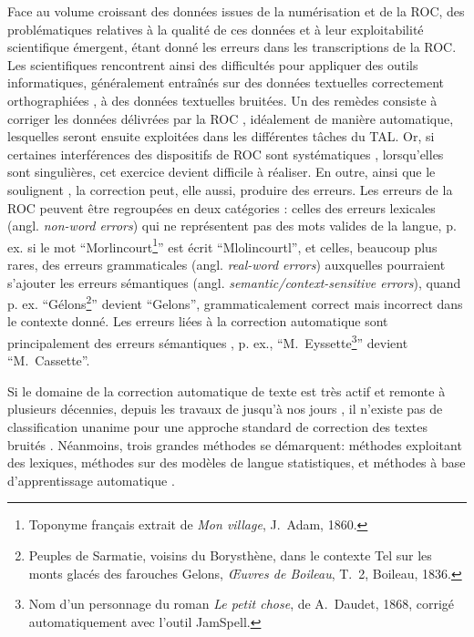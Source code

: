 Face au volume croissant des données issues de la numérisation et de la ROC, des problématiques relatives à la qualité de ces données et à leur exploitabilité scientifique émergent, étant donné 
les erreurs dans les transcriptions de la ROC. Les scientifiques rencontrent ainsi des difficultés pour appliquer des outils informatiques, généralement entraînés sur des données textuelles correctement orthographiées \cite{DBLP:journals/corr/EshelCRMYL17}, à des données textuelles bruitées. Un des remèdes consiste à corriger les données délivrées par la ROC \cite{DBLP:conf/taln/SagotG14}, idéalement de manière automatique, lesquelles seront ensuite exploitées dans les différentes tâches du TAL. Or, si certaines interférences des dispositifs de ROC sont systématiques \cite{stanislawek-2019}, lorsqu’elles sont singulières, cet exercice devient difficile à réaliser. En outre, ainsi que le soulignent , la correction peut, elle aussi, produire des erreurs. 
Les erreurs de la ROC peuvent être regroupées en deux catégories \cite{oger} : celles des erreurs lexicales (angl. \textit{non-word errors}) qui ne représentent pas des mots valides de la langue, p. ex. si le mot “Morlincourt\footnote{Toponyme français extrait de \textit{Mon village}, J.\ Adam, 1860.}” est écrit “Mlolincourtl”, et celles, beaucoup plus rares, des erreurs grammaticales (angl. \textit{real-word errors}) \cite{wisniewski} auxquelles pourraient s'ajouter les erreurs sémantiques (angl. \textit{semantic/context-sensitive errors}), quand p. ex. “Gélons\footnote{Peuples de Sarmatie, voisins du Borysthène, dans le contexte  \og{}Tel sur les monts glacés des farouches Gelons\fg{}, \textit{Œuvres de Boileau}, T.\ 2, Boileau, 1836.}” devient “Gelons”, grammaticalement correct mais incorrect dans le contexte donné. Les erreurs liées à la correction automatique sont principalement des erreurs sémantiques \cite{azmi}, p. ex., “M.\ Eyssette\footnote{Nom d’un personnage du roman \textit{Le petit chose}, de A.\ Daudet, 1868, corrigé automatiquement avec l'outil JamSpell.}” devient “M.\ Cassette”. 

Si le domaine de la correction automatique de texte est très actif et remonte à plusieurs décennies, depuis les travaux de  jusqu’à nos jours \cite{nguyen2021}, il n’existe pas de classification unanime pour une approche standard de correction des textes bruités \cite{DBLP:journals/corr/abs-1203-5255,dumasmilneedwards:tel-01562039,Nguyen-2020}. %
Néanmoins, trois grandes méthodes se démarquent: méthodes exploitant des lexiques, méthodes sur des modèles de langue statistiques, et méthodes à base d’apprentissage automatique \cite{petkovic2022impact}. 

